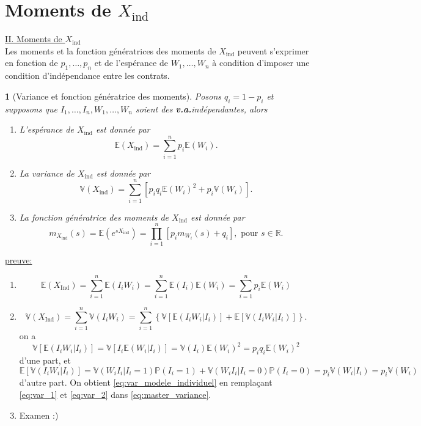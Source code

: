 \documentclass[8pt,notheorems]{beamer}
\def \E{\mathbb E}
\def \P {\mathbb P}
\def \V{\mathbb V}
\newcommand{\R}{\mathbb{R}}
\newcommand{\va}{\textbf{v.a.}}
\newtheorem{prop}{\translate{Proposition}}
\theoremstyle{definition}
\theoremstyle{example}
\theoremstyle{mystyle}
\theoremstyle{plain}
\begin{document}
\section{Moments de $X_{\text{ind}}$}
\begin{frame}[allowframebreaks]
\underline{II. Moments de $X_{\text{ind}}$}\\
Les moments et la fonction génératrices des moments de $X_{\text{ind}}$ peuvent s'exprimer en fonction de $p_1,\ldots,p_n$ et de l'espérance de $W_1,\ldots, W_n$ à condition d'imposer une condition d'indépendance entre les contrats. 
\begin{prop}[Variance et fonction génératrice des moments]
Posons $q_i = 1-p_i$ et supposons que $I_1,\ldots,I_n,W_1,\ldots, W_n$ soient des \va indépendantes, alors 
\begin{enumerate}
    \item L'espérance de $X_{\text{ind}}$ est donnée par 
    $$
    \E(X_{\text{ind}}) =  \sum_{i = 1}^{n}p_i\E(W_i).
    $$
    \item La variance de $X_{\text{ind}}$ est donnée par
    \begin{equation}\label{eq:var_modele_individuel}
    \V(X_{\text{ind}}) =  \sum_{i = 1}^{n}\left[p_iq_i\E(W_i)^2 + p_i\V(W_i)\right].
    \end{equation}
    \item La fonction génératrice des moments de $X_{\text{ind}}$ est donnée par
    $$
    m_{X_{\text{ind}}}(s) =\E\left(e^{sX_{\text{ind}}}\right) = \prod_{i = 1}^{n}\left[p_im_{W_i}(s) + q_i\right],\text{ pour }s\in \R.
    $$
\end{enumerate}
\end{prop}
\underline{preuve:}\\
\begin{enumerate}
    \item
    $$
    \E(X_{\text{Ind}}) = \sum_{i=1}^n\E(I_iW_i)=\sum_{i=1}^n\E(I_i)\E(W_i) =\sum_{i=1}^np_i\E(W_i)   
    $$
    \item
    \begin{equation}\label{eq:master_variance}
    \V(X_{\text{Ind}}) = \sum_{i=1}^n\V(I_iW_i)=\sum_{i=1}^n\left\{\V[\E(I_iW_i|I_i)]+\E[\V(I_iW_i|I_i)]\right\}.   
    \end{equation}
    on a 
    \begin{equation}\label{eq:var_1}
    \V[\E(I_iW_i|I_i)]= \V[I_i\E(W_i|I_i)] = \V(I_i)\E(W_i)^2 = p_iq_i\E(W_i)^2
    \end{equation}
    d'une part, et 
    \begin{equation}\label{eq:var_2}
    \E[\V(I_iW_i|I_i)]= \V(W_iI_i|I_i = 1)\P(I_i= 1)+ \V(W_iI_i|I_i = 0)\P(I_i= 0) = p_i\V(W_i|I_i) = p_i\V(W_i)
    \end{equation}
    d'autre part. On obtient \eqref{eq:var_modele_individuel} en remplaçant \eqref{eq:var_1} et \eqref{eq:var_2} dans \eqref{eq:master_variance}. 
    \item Examen :)
\end{enumerate}
\end{frame}
\end{document}
